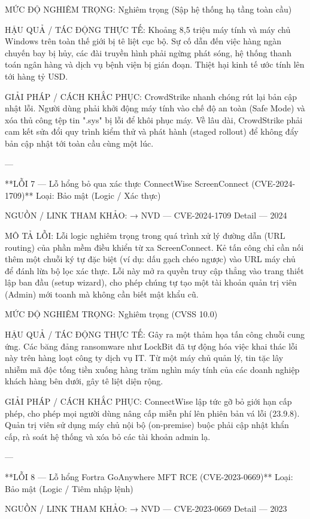 MỨC ĐỘ NGHIÊM TRỌNG:
Nghiêm trọng (Sập hệ thống hạ tầng toàn cầu)

HẬU QUẢ / TÁC ĐỘNG THỰC TẾ:
Khoảng 8,5 triệu máy tính và máy chủ Windows trên toàn thế giới bị tê liệt cục bộ. Sự cố dẫn đến việc hàng ngàn chuyến bay bị hủy, các đài truyền hình phải ngừng phát sóng, hệ thống thanh toán ngân hàng và dịch vụ bệnh viện bị gián đoạn. Thiệt hại kinh tế ước tính lên tới hàng tỷ USD.

GIẢI PHÁP / CÁCH KHẮC PHỤC:
CrowdStrike nhanh chóng rút lại bản cập nhật lỗi. Người dùng phải khởi động máy tính vào chế độ an toàn (Safe Mode) và xóa thủ công tệp tin ".sys" bị lỗi để khôi phục máy. Về lâu dài, CrowdStrike phải cam kết sửa đổi quy trình kiểm thử và phát hành (staged rollout) để không đẩy bản cập nhật tới toàn cầu cùng một lúc.

---

**LỖI 7 — Lỗ hổng bỏ qua xác thực ConnectWise ScreenConnect (CVE-2024-1709)**
Loại: Bảo mật (Logic / Xác thực)

NGUỒN / LINK THAM KHẢO:
→ NVD — CVE-2024-1709 Detail — 2024

MÔ TẢ LỖI:
Lỗi logic nghiêm trọng trong quá trình xử lý đường dẫn (URL routing) của phần mềm điều khiển từ xa ScreenConnect. Kẻ tấn công chỉ cần nối thêm một chuỗi ký tự đặc biệt (ví dụ: dấu gạch chéo ngược) vào URL máy chủ để đánh lừa bộ lọc xác thực. Lỗi này mở ra quyền truy cập thẳng vào trang thiết lập ban đầu (setup wizard), cho phép chúng tự tạo một tài khoản quản trị viên (Admin) mới toanh mà không cần biết mật khẩu cũ.

MỨC ĐỘ NGHIÊM TRỌNG:
Nghiêm trọng (CVSS 10.0)

HẬU QUẢ / TÁC ĐỘNG THỰC TẾ:
Gây ra một thảm họa tấn công chuỗi cung ứng. Các băng đảng ransomware như LockBit đã tự động hóa việc khai thác lỗi này trên hàng loạt công ty dịch vụ IT. Từ một máy chủ quản lý, tin tặc lây nhiễm mã độc tống tiền xuống hàng trăm nghìn máy tính của các doanh nghiệp khách hàng bên dưới, gây tê liệt diện rộng.

GIẢI PHÁP / CÁCH KHẮC PHỤC:
ConnectWise lập tức gỡ bỏ giới hạn cấp phép, cho phép mọi người dùng nâng cấp miễn phí lên phiên bản vá lỗi (23.9.8). Quản trị viên sử dụng máy chủ nội bộ (on-premise) buộc phải cập nhật khẩn cấp, rà soát hệ thống và xóa bỏ các tài khoản admin lạ.

---

**LỖI 8 — Lỗ hổng Fortra GoAnywhere MFT RCE (CVE-2023-0669)**
Loại: Bảo mật (Logic / Tiêm nhập lệnh)

NGUỒN / LINK THAM KHẢO:
→ NVD — CVE-2023-0669 Detail — 2023

